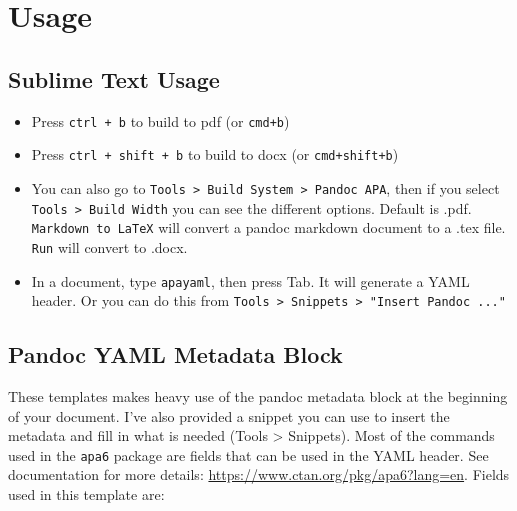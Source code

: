 \documentclass[doc,longtable]{apa6}
\begin{document}
\section{Usage}\label{usage}

\subsection{Sublime Text Usage}\label{sublime-text-usage}

\begin{itemize}
\item
  Press \texttt{ctrl\ +\ b} to build to pdf (or \texttt{cmd+b})
\item
  Press \texttt{ctrl\ +\ shift\ +\ b} to build to docx (or \texttt{cmd+shift+b})
\item
  You can also go to \texttt{Tools\ \textgreater{}\ Build\ System\ \textgreater{}\ Pandoc\ APA}, then if you select \texttt{Tools\ \textgreater{}\ Build\ Width} you can see the different options. Default is .pdf. \texttt{Markdown\ to\ LaTeX} will convert a pandoc markdown document to a .tex file. \texttt{Run} will convert to .docx.
\item
  In a document, type \texttt{apayaml}, then press Tab. It will generate a YAML header. Or you can do this from \texttt{Tools\ \textgreater{}\ Snippets\ \textgreater{}\ "Insert\ Pandoc\ ..."}
\end{itemize}

\subsection{Pandoc YAML Metadata Block}\label{pandoc-yaml-metadata-block}

These templates makes heavy use of the pandoc metadata block at the beginning of your document. I've also provided a snippet you can use to insert the metadata and fill in what is needed (Tools \textgreater{} Snippets). Most of the commands used in the \texttt{apa6} package are fields that can be used in the YAML header. See documentation for more details: \url{https://www.ctan.org/pkg/apa6?lang=en}. Fields used in this template are:
\end{document}
